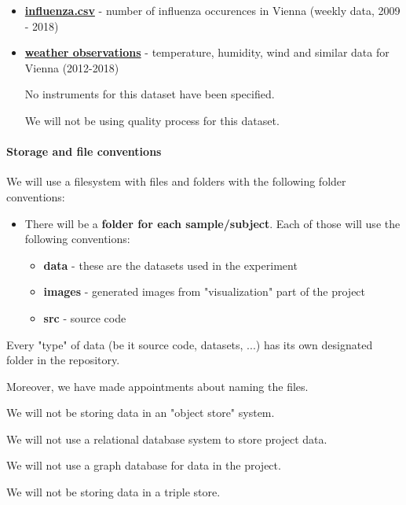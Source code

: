 \documentclass[
]{article}
\providecommand{\tightlist}{%
  \setlength{\itemsep}{0pt}\setlength{\parskip}{0pt}}
\begin{document}
\begin{itemize}
  \item \textbf{\href{https://www.data.gv.at/katalog/dataset/grippemeldedienst-stadt-wien}{influenza.csv}} - number of influenza occurences in Vienna (weekly data, 2009 - 2018)
  \item \textbf{\href{https://www.meteoblue.com/en/weather/archive/export/vienna_austria_2761369}{weather observations}} - temperature, humidity, wind and similar data for Vienna (2012-2018)

  No instruments for this dataset have been specified.

  We will not be using quality process for this dataset.
\end{itemize}

\hypertarget{storage-and-file-conventions}{%
\paragraph{Storage and file
conventions}\label{storage-and-file-conventions}}

We will use a filesystem with files and folders with the following
folder conventions:

\begin{itemize}
\tightlist
\item
  There will be a \textbf{folder for each sample/subject}. Each of those
  will use the following conventions:
  \begin{itemize}
      \item \textbf{data} - these are the datasets used in the experiment
      \item \textbf{images} - generated images from "visualization" part of the project
      \item \textbf{src} - source code
  \end{itemize} 
\end{itemize}
Every "type" of data (be it source code, datasets, ...) has its own designated folder in the repository.

Moreover, we have made appointments about naming the files.

We will not be storing data in an "object store" system.

We will not use a relational database system to store project data.

We will not use a graph database for data in the project.

We will not be storing data in a triple store.
\end{document}
